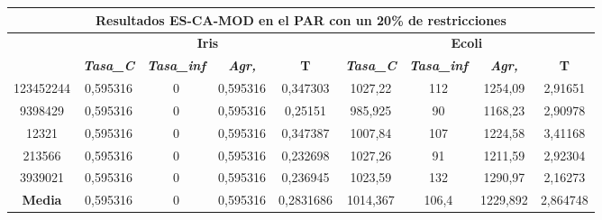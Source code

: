 \documentclass[12pt, spanish]{article}
\begin{document}
\begin{table}[H]
\begin{tabular}{|c|c|c|c|c|c|c|c|c|}
\hline
\multicolumn{9}{|c|}{\textbf{Resultados ES-CA-MOD en el PAR con un 20\% de restricciones}}                                                                                                                        \\ \hline
\multirow{2}{*}{} & \multicolumn{4}{c|}{\textbf{Iris}}                                                            & \multicolumn{4}{c|}{\textbf{Ecoli}}                                                           \\ \cline{2-9} 
                  & \textit{\textbf{Tasa\_C}} & \textit{\textbf{Tasa\_inf}} & \textit{\textbf{Agr,}} & \textbf{T} & \textit{\textbf{Tasa\_C}} & \textit{\textbf{Tasa\_inf}} & \textit{\textbf{Agr,}} & \textbf{T} \\ \hline
123452244         & 0,595316                  & 0                           & 0,595316               & 0,347303   & 1027,22                   & 112                         & 1254,09                & 2,91651    \\ \hline
9398429           & 0,595316                  & 0                           & 0,595316               & 0,25151    & 985,925                   & 90                          & 1168,23                & 2,90978    \\ \hline
12321             & 0,595316                  & 0                           & 0,595316               & 0,347387   & 1007,84                   & 107                         & 1224,58                & 3,41168    \\ \hline
213566            & 0,595316                  & 0                           & 0,595316               & 0,232698   & 1027,26                   & 91                          & 1211,59                & 2,92304    \\ \hline
3939021           & 0,595316                  & 0                           & 0,595316               & 0,236945   & 1023,59                   & 132                         & 1290,97                & 2,16273    \\ \hline
\textbf{Media}    & 0,595316                  & 0                           & 0,595316               & 0,2831686  & 1014,367                  & 106,4                       & 1229,892               & 2,864748   \\ \hline
\end{tabular}
\end{table}
\end{document}
